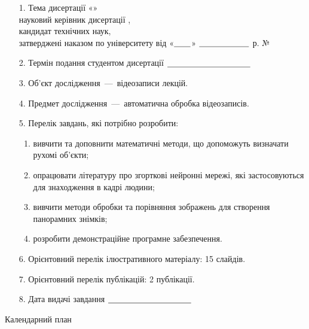 \begin{enumerate}
    \item[1.]
        Тема дисертації «\theme» \\
        науковий керівник дисертації \mentorName, \\
        кандидат технічних наук, \\
        затверджені наказом по університету від
        «${\text{\underline{\hspace{2em}}}}$»
        ${\text{\underline{\hspace{6em}}}}$  \passYear р. №
    \item[2.]
        Термін подання студентом дисертації ${\text{\underline{\hspace{10em}}}}$
    \item[3.]
        Об’єкт дослідження~---~відеозаписи лекцій.
    \item[4.]
        Предмет дослідження~---~автоматична обробка
        відеозаписів.
    \item[5.]
        Перелік завдань, які потрібно розробити:
        \begin{enumerate}
            \item
                  вивчити та доповнити математичні методи,
                  що допоможуть визначати рухомі об'єкти;
            \item
                  опрацювати літературу про згорткові нейронні мережі, які застосовуються
                  для знаходження в кадрі людини;
            \item
                  вивчити методи обробки та порівняння зображень для створення панорамних знімків;
            \item
                  розробити демонстраційне програмне забезпечення.
        \end{enumerate}
    \item[6.]
        Орієнтовний перелік ілюстративного матеріалу: 15 слайдів.
    \item[7.]
        Орієнтовний перелік публікацій: 2 публікації.
    \item[8.]
        Дата видачі завдання ${\text{\underline{\hspace{10em}}}}$
\end{enumerate}

\begin{center}
    Календарний план
\end{center}

